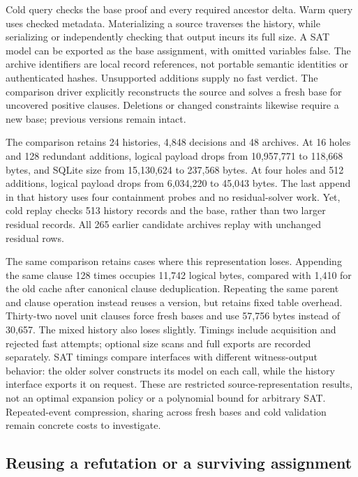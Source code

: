 \documentclass[11pt,a4paper]{article}
\numberwithin{equation}{section}
\theoremstyle{plain}
\theoremstyle{definition}
\theoremstyle{remark}
\begin{document}
Cold query checks the base proof and every required ancestor delta. Warm query uses checked metadata. Materializing a source traverses the history, while serializing or independently checking that output incurs its full size. A SAT model can be exported as the base assignment, with omitted variables false. The archive identifiers are local record references, not portable semantic identities or authenticated hashes. Unsupported additions supply no fast verdict. The comparison driver explicitly reconstructs the source and solves a fresh base for uncovered positive clauses. Deletions or changed constraints likewise require a new base; previous versions remain intact.

The comparison retains 24 histories, 4,848 decisions and 48 archives. At 16 holes and 128 redundant additions, logical payload drops from 10,957,771 to 118,668 bytes, and SQLite size from 15,130,624 to 237,568 bytes. At four holes and 512 additions, logical payload drops from 6,034,220 to 45,043 bytes. The last append in that history uses four containment probes and no residual-solver work. Yet, cold replay checks 513 history records and the base, rather than two larger residual records. All 265 earlier candidate archives replay with unchanged residual rows.

The same comparison retains cases where this representation loses. Appending the same clause 128 times occupies 11,742 logical bytes, compared with 1,410 for the old cache after canonical clause deduplication. Repeating the same parent and clause operation instead reuses a version, but retains fixed table overhead. Thirty-two novel unit clauses force fresh bases and use 57,756 bytes instead of 30,657. The mixed history also loses slightly. Timings include acquisition and rejected fast attempts; optional size scans and full exports are recorded separately. SAT timings compare interfaces with different witness-output behavior: the older solver constructs its model on each call, while the history interface exports it on request. These are restricted source-representation results, not an optimal expansion policy or a polynomial bound for arbitrary SAT. Repeated-event compression, sharing across fresh bases and cold validation remain concrete costs to investigate.

\subsection{Reusing a refutation or a surviving assignment}
\label{sec:decision-history}
\end{document}
